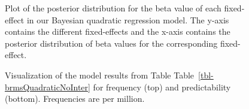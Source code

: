 \documentclass[
  authoryear,
  preprint,
  1p,
  onecolumn]{elsarticle}
\begin{document}
\begin{figure}


\caption{\label{fig-posteriorplotFullQuadratic}Plot of the posterior
distribution for the beta value of each fixed-effect in our Bayesian
quadratic regression model. The y-axis contains the different
fixed-effects and the x-axis contains the posterior distribution of beta
values for the corresponding fixed-effect.}

\end{figure}%

\begin{figure}


\caption{\label{fig-FullQuadraticPlot}Visualization of the model results
from Table Table~\ref{tbl-brmsQuadraticNoInter} for frequency (top) and
predictability (bottom). Frequencies are per million.}

\end{figure}%
\end{document}
